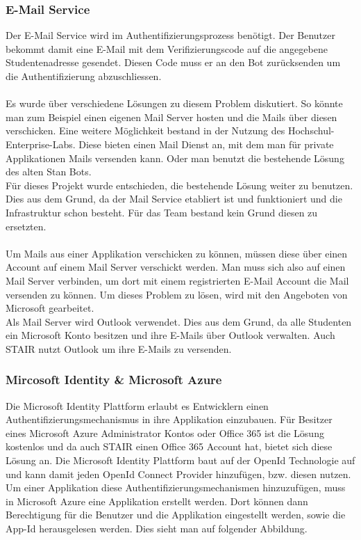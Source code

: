 \documentclass[a4paper, table]{article}
\begin{document}
\subsubsection{E-Mail Service}
Der E-Mail Service wird im Authentifizierungsprozess benötigt.
Der Benutzer bekommt damit eine E-Mail mit dem Verifizierungscode auf die angegebene Studentenadresse gesendet.
Diesen Code muss er an den Bot zurücksenden um die Authentifizierung abzuschliessen.\\\\
Es wurde über verschiedene Lösungen zu diesem Problem diskutiert.
So könnte man zum Beispiel einen eigenen Mail Server hosten und die Mails über diesen verschicken.
Eine weitere Möglichkeit bestand in der Nutzung des Hochschul-Enterprise-Labs.
Diese bieten einen Mail Dienst an, mit dem man für private Applikationen Mails versenden kann.
Oder man benutzt die bestehende Lösung des alten Stan Bots.\\
Für dieses Projekt wurde entschieden, die bestehende Lösung weiter zu benutzen.
Dies aus dem Grund, da der Mail Service etabliert ist und funktioniert und die Infrastruktur schon besteht.
Für das Team bestand kein Grund diesen zu ersetzten.\\\\
Um Mails aus einer Applikation verschicken zu können, müssen diese über einen Account auf einem Mail Server verschickt werden.
Man muss sich also auf einen Mail Server verbinden, um dort mit einem registrierten E-Mail Account die Mail versenden zu können.
Um dieses Problem zu lösen, wird mit den Angeboten von Microsoft gearbeitet.\\
Als Mail Server wird Outlook verwendet.
Dies aus dem Grund, da alle Studenten ein Microsoft Konto besitzen und ihre E-Mails über Outlook verwalten.
Auch STAIR nutzt Outlook um ihre E-Mails zu versenden.

\subsubsection*{Mircosoft Identity \& Microsoft Azure}
Die Microsoft Identity Plattform erlaubt es Entwicklern einen Authentifizierungsmechanismus in ihre Applikation einzubauen.
Für Besitzer eines Microsoft Azure Administrator Kontos oder Office 365 ist die Lösung kostenlos und da auch STAIR einen Office 365 Account hat,
bietet sich diese Lösung an.
Die Microsoft Identity Plattform baut auf der OpenId Technologie auf und kann damit jeden OpenId Connect Provider hinzufügen, \gls{bzw.} diesen nutzen.
Um einer Applikation diese Authentifizierungsmechanismen hinzuzufügen, muss in Microsoft Azure eine Applikation erstellt werden.
Dort können dann Berechtigung für die Benutzer und die Applikation eingestellt werden, sowie die App-Id herausgelesen werden. \autocite{noauthor_introduction_nodate}
Dies sieht man auf folgender Abbildung.
\end{document}
